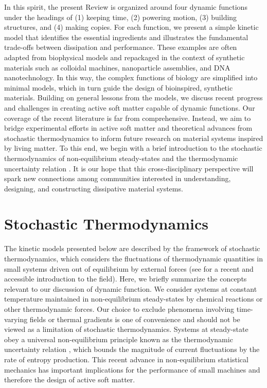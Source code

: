 \begin{appendices}
In this spirit, the present Review is organized around four dynamic functions under the headings of (1) keeping time, (2) powering motion, (3) building structures, and (4) making copies. For each function, we present a simple kinetic model that identifies the essential ingredients and illustrates the fundamental trade-offs between dissipation and performance. These examples are often adapted from biophysical models and repackaged in the context of synthetic materials such as colloidal machines, nanoparticle assemblies, and DNA nanotechnology. In this way, the complex functions of biology are simplified into minimal models, which in turn guide the design of bioinspired, synthetic materials. Building on general lessons from the models, we discuss recent progress and challenges in creating active soft matter capable of dynamic functions. Our coverage of the recent literature is far from comprehensive. Instead, we aim to bridge experimental efforts in active soft matter and theoretical advances from stochastic thermodynamics to inform future research on material systems inspired by living matter. To this end, we begin with a brief introduction to the stochastic thermodynamics of non-equilibrium steady-states and the thermodynamic uncertainty relation  \autocite{Barato2015, Gingrich2016, Pietzonka2016b}. It is our hope that this cross-disciplinary perspective will spark new connections among communities interested in understanding, designing, and constructing dissipative material systems.

\section{Stochastic Thermodynamics}

The kinetic models presented below are described by the framework of stochastic thermodynamics, which considers the fluctuations of thermodynamic quantities in small systems driven out of equilibrium by external forces \autocite{Seifert2012, VanDenBroeck2015, Ciliberto2017} (see \autocite{Seifert2018} for a recent and accessible introduction to the field).  Here, we briefly summarize the concepts relevant to our discussion of dynamic function. We consider systems at constant temperature maintained in non-equilibrium steady-states by chemical reactions or other thermodynamic forces.  Our choice to exclude phenomena involving time-varying fields \autocite{Barato2016,Barato2017b} or thermal gradients \autocite{Pietzonka2018} is one of convenience and should not be viewed as a limitation of stochastic thermodynamics.  Systems at steady-state obey a universal non-equilibrium principle known as the thermodynamic uncertainty relation \autocite{Barato2015, Gingrich2016, Pietzonka2016b}, which bounds the magnitude of current fluctuations by the rate of entropy production.  This recent advance in non-equilibrium statistical mechanics has important implications for the performance of small machines and therefore the design of active soft matter.


\end{appendices}
